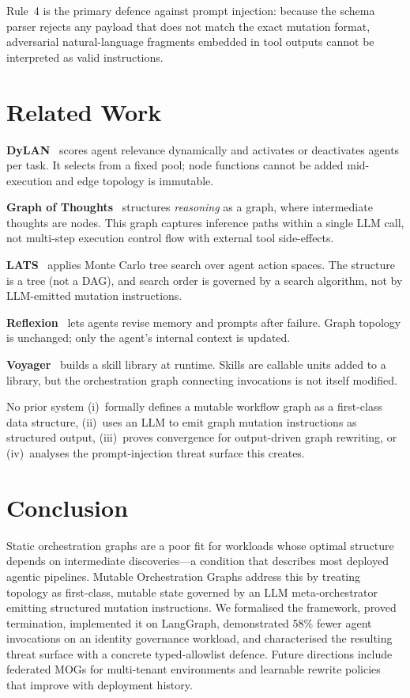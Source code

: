 \documentclass[conference]{IEEEtran}
\begin{document}
Rule~4 is the primary defence against prompt injection: because the
schema parser rejects any payload that does not match the exact
mutation format, adversarial natural-language fragments embedded in
tool outputs cannot be interpreted as valid instructions.

\section{Related Work}
\label{sec:related}

\textbf{DyLAN}~\cite{dylan2023} scores agent relevance dynamically and
activates or deactivates agents per task. It selects from a fixed pool;
node functions cannot be added mid-execution and edge topology is
immutable.

\textbf{Graph of Thoughts}~\cite{got2023} structures \emph{reasoning}
as a graph, where intermediate thoughts are nodes. This graph captures
inference paths within a single LLM call, not multi-step execution
control flow with external tool side-effects.

\textbf{LATS}~\cite{lats2023} applies Monte Carlo tree search over
agent action spaces. The structure is a tree (not a DAG), and search
order is governed by a search algorithm, not by LLM-emitted mutation
instructions.

\textbf{Reflexion}~\cite{reflexion2023} lets agents revise memory and
prompts after failure. Graph topology is unchanged; only the agent's
internal context is updated.

\textbf{Voyager}~\cite{voyager2023} builds a skill library at runtime.
Skills are callable units added to a library, but the orchestration
graph connecting invocations is not itself modified.

No prior system (i)~formally defines a mutable workflow graph as a
first-class data structure, (ii)~uses an LLM to emit graph mutation
instructions as structured output, (iii)~proves convergence for
output-driven graph rewriting, or (iv)~analyses the prompt-injection
threat surface this creates.

\section{Conclusion}
\label{sec:conclusion}

Static orchestration graphs are a poor fit for workloads whose
optimal structure depends on intermediate discoveries---a condition
that describes most deployed agentic pipelines. Mutable Orchestration
Graphs address this by treating topology as first-class, mutable
state governed by an LLM meta-orchestrator emitting structured
mutation instructions. We formalised the framework, proved termination,
implemented it on LangGraph, demonstrated 58\% fewer agent invocations
on an identity governance workload, and characterised the resulting
threat surface with a concrete typed-allowlist defence.
Future directions include federated MOGs for multi-tenant environments
and learnable rewrite policies that improve with deployment history.
\end{document}

